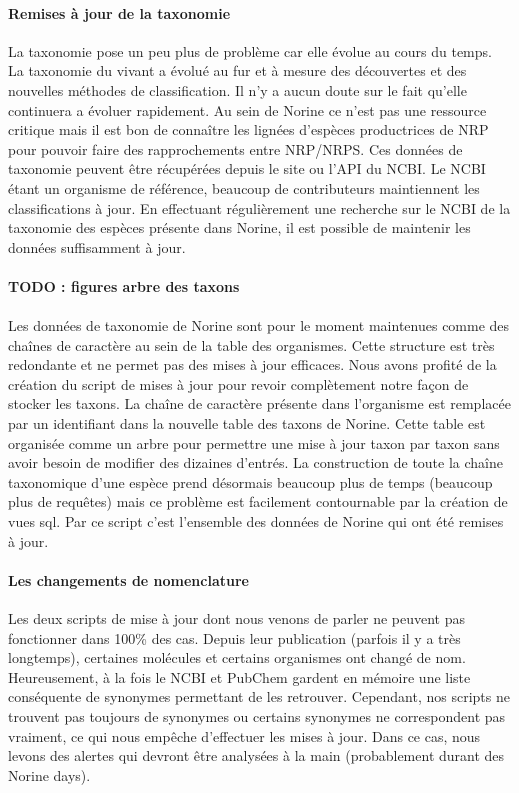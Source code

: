 \documentclass[12pt,french,twoside]{report}
\begin{document}
\paragraph{Remises à jour de la taxonomie}
La taxonomie pose un peu plus de problème car elle évolue au cours du temps.
La taxonomie du vivant a évolué au fur et à mesure des découvertes et des nouvelles méthodes de classification.
Il n'y a aucun doute sur le fait qu'elle continuera a évoluer rapidement.
Au sein de Norine ce n'est pas une ressource critique mais il est bon de connaître les lignées d'espèces productrices de NRP pour pouvoir faire des rapprochements entre NRP/NRPS.
Ces données de taxonomie peuvent être récupérées depuis le site ou l'API du NCBI.
Le NCBI étant un organisme de référence, beaucoup de contributeurs maintiennent les classifications à jour.
En effectuant régulièrement une recherche sur le NCBI de la taxonomie des espèces présente dans Norine, il est possible de maintenir les données suffisamment à jour.

\paragraph{TODO : figures arbre des taxons}

\paragraph{}Les données de taxonomie de Norine sont pour le moment maintenues comme des chaînes de caractère au sein de la table des organismes.
Cette structure est très redondante et ne permet pas des mises à jour efficaces.
Nous avons profité de la création du script de mises à jour pour revoir complètement notre façon de stocker les taxons.
La chaîne de caractère présente dans l'organisme est remplacée par un identifiant dans la nouvelle table des taxons de Norine.
Cette table est organisée comme un arbre pour permettre une mise à jour taxon par taxon sans avoir besoin de modifier des dizaines d'entrés.
La construction de toute la chaîne taxonomique d'une espèce prend désormais beaucoup plus de temps (beaucoup plus de requêtes) mais ce problème est facilement contournable par la création de vues sql.
Par ce script c'est l'ensemble des données de Norine qui ont été remises à jour.


\paragraph{Les changements de nomenclature}
Les deux scripts de mise à jour dont nous venons de parler ne peuvent pas fonctionner dans 100\% des cas.
Depuis leur publication (parfois il y a très longtemps), certaines molécules et certains organismes ont changé de nom.
Heureusement, à la fois le NCBI et PubChem gardent en mémoire une liste conséquente de synonymes permettant de les retrouver.
Cependant, nos scripts ne trouvent pas toujours de synonymes ou certains synonymes ne correspondent pas vraiment, ce qui nous empêche d'effectuer les mises à jour.
Dans ce cas, nous levons des alertes qui devront être analysées à la main (probablement durant des Norine days).
\end{document}
